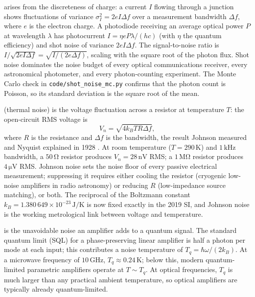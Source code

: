  arises from the discreteness of charge: a current
$I$ flowing through a junction shows fluctuations of variance
$\sigma_{I}^{2} = 2eI\Delta f$ over a measurement bandwidth $\Delta
f$, where $e$ is the electron charge. A photodiode receiving an
average optical power $P$ at wavelength $\lambda$ has photocurrent
$I = \eta eP\lambda/(hc)$ (with $\eta$ the quantum efficiency) and
shot noise of variance $2eI\Delta f$. The signal-to-noise ratio is
$I/\sqrt{2eI\Delta f} = \sqrt{I/(2e\Delta f)}$, scaling with the
square root of the photon flux. Shot noise dominates the noise budget
of every optical communications receiver, every astronomical
photometer, and every photon-counting experiment. The Monte Carlo
check in \texttt{code/shot\_noise\_mc.py} confirms that the photon
count is Poisson, so its standard deviation is the square root of the
mean.

 (thermal noise) is the voltage
fluctuation across a resistor at temperature $T$: the open-circuit
RMS voltage is
\[
V_{n} = \sqrt{4k_{B}TR\Delta f},
\]
where $R$ is the resistance and $\Delta f$ is the bandwidth, the result
Johnson measured and Nyquist explained in 1928
\cite{paper:ch05-johnson-1928, paper:ch05-nyquist-1928}. At room
temperature ($T = 290\,\si{\kelvin}$) and $1\,\si{\kilo\hertz}$
bandwidth, a $50\,\si{\ohm}$ resistor produces $V_{n} = 28\,\si{\nano
\volt}$ RMS; a $1\,\si{\mega\ohm}$ resistor produces $4\,\si{\micro
\volt}$ RMS. Johnson noise sets the noise floor of every passive
electrical measurement; suppressing it requires either cooling the
resistor (cryogenic low-noise amplifiers in radio astronomy) or
reducing $R$ (low-impedance source matching), or both. The reciprocal
of the Boltzmann constant $k_{B} = 1.380\,649\times 10^{-23}\,\si{
\joule\per\kelvin}$ is now fixed exactly in the 2019 SI, and Johnson
noise is the working metrological link between voltage and
temperature.

 is the unavoidable noise an
amplifier adds to a quantum signal. The standard quantum limit (SQL)
for a phase-preserving linear amplifier is half a photon per mode at
each input; this contributes a noise temperature of $T_{q} =
\hbar\omega/(2k_{B})$. At a microwave frequency of $10\,\si{\giga
\hertz}$, $T_{q} \approx 0.24\,\si{\kelvin}$; below this, modern
quantum-limited parametric amplifiers operate at $T \sim T_{q}$. At
optical frequencies, $T_{q}$ is much larger than any practical
ambient temperature, so optical amplifiers are typically already
quantum-limited.

